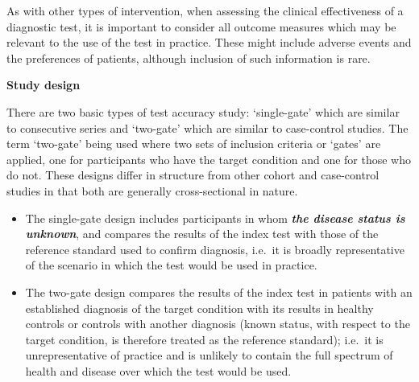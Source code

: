 \documentclass[
  10pt,
  a4paper,
  DIV=11,
  numbers=noendperiod]{scrreprt}
\begin{document}
As with other types of intervention, when assessing the clinical
effectiveness of a diagnostic test, it is important to consider all
outcome measures which may be relevant to the use of the test in
practice. These might include adverse events and the preferences of
patients, although inclusion of such information is rare.

\textbf{Study design}

There are two basic types of test accuracy study: `single-gate' which
are similar to consecutive series and `two-gate' which are similar to
case-control studies. The term `two-gate' being used where two sets of
inclusion criteria or `gates' are applied, one for participants who have
the target condition and one for those who do not. These designs differ
in structure from other cohort and case-control studies in that both are
generally cross-sectional in nature.

\begin{itemize}
\item
  The single-gate design includes participants in whom \textbf{\emph{the
  disease status is unknown}}, and compares the results of the index
  test with those of the reference standard used to confirm diagnosis,
  i.e.~it is broadly representative of the scenario in which the test
  would be used in practice.
\item
  The two-gate design compares the results of the index test in patients
  with an established diagnosis of the target condition with its results
  in healthy controls or controls with another diagnosis (known status,
  with respect to the target condition, is therefore treated as the
  reference standard); i.e.~it is unrepresentative of practice and is
  unlikely to contain the full spectrum of health and disease over which
  the test would be used.
\end{itemize}
\end{document}
